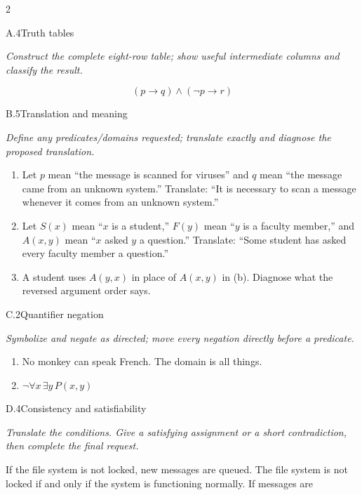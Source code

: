 \documentclass[9pt]{extarticle}
\begin{document}
\CoreWorkArea
\FormBreak
{}
\begin{multicols}{2}
\begin{CoreProblem}{A.4}{Truth tables}
{\scriptsize\textit{Construct the complete eight-row table; show useful intermediate columns and classify the result.}\par}
\[
  (p\to q)\land(\neg p\to r)
\]
\end{CoreProblem}
\begin{CoreProblem}{B.5}{Translation and meaning}
{\scriptsize\textit{Define any predicates/domains requested; translate exactly and diagnose the proposed translation.}\par}
\begin{enumerate}[label=(\alph*)]
  \item Let $p$ mean ``the message is scanned for viruses'' and $q$ mean ``the
        message came from an unknown system.'' Translate: ``It is necessary to
        scan a message whenever it comes from an unknown system.''
  \item Let $S(x)$ mean ``$x$ is a student,'' $F(y)$ mean ``$y$ is a faculty
        member,'' and $A(x,y)$ mean ``$x$ asked $y$ a question.'' Translate:
        ``Some student has asked every faculty member a question.''
  \item A student uses $A(y,x)$ in place of $A(x,y)$ in (b). Diagnose what the
        reversed argument order says.
\end{enumerate}
\end{CoreProblem}
\begin{CoreProblem}{C.2}{Quantifier negation}
{\scriptsize\textit{Symbolize and negate as directed; move every negation directly before a predicate.}\par}
\begin{enumerate}[label=(\alph*)]
  \item No monkey can speak French. The domain is all things.
  \item $\neg\forall x\,\exists y\,P(x,y)$
\end{enumerate}
\end{CoreProblem}
\columnbreak
\begin{CoreProblem}{D.4}{Consistency and satisfiability}
{\scriptsize\textit{Translate the conditions. Give a satisfying assignment or a short contradiction, then complete the final request.}\par}
If the file system is not locked, new messages are queued. The file system is
not locked if and only if the system is functioning normally. If messages are

\end{CoreProblem}
\end{multicols}
\end{document}
